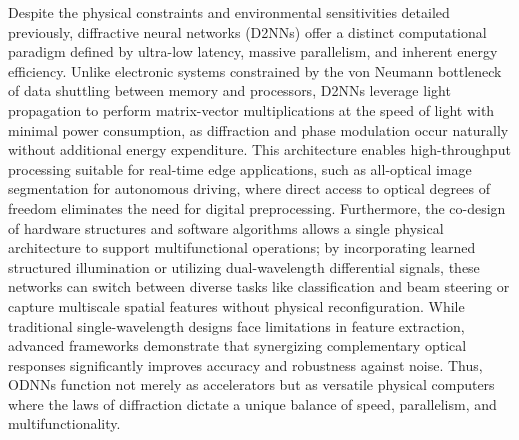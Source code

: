 \documentclass[11pt]{article}
\begin{document}
Despite the physical constraints and environmental sensitivities detailed previously, diffractive neural networks (D2NNs) offer a distinct computational paradigm defined by ultra-low latency, massive parallelism, and inherent energy efficiency. Unlike electronic systems constrained by the von Neumann bottleneck of data shuttling between memory and processors, D2NNs leverage light propagation to perform matrix-vector multiplications at the speed of light with minimal power consumption, as diffraction and phase modulation occur naturally without additional energy expenditure. This architecture enables high-throughput processing suitable for real-time edge applications, such as all-optical image segmentation for autonomous driving, where direct access to optical degrees of freedom eliminates the need for digital preprocessing. Furthermore, the co-design of hardware structures and software algorithms allows a single physical architecture to support multifunctional operations; by incorporating learned structured illumination or utilizing dual-wavelength differential signals, these networks can switch between diverse tasks like classification and beam steering or capture multiscale spatial features without physical reconfiguration. While traditional single-wavelength designs face limitations in feature extraction, advanced frameworks demonstrate that synergizing complementary optical responses significantly improves accuracy and robustness against noise. Thus, ODNNs function not merely as accelerators but as versatile physical computers where the laws of diffraction dictate a unique balance of speed, parallelism, and multifunctionality. \citep{doi_10_48550_arxiv_2602_07717_16cb1c7a} \citep{doi_10_1364_prj_576203_ae347fba} \citep{doi_10_1038_s41467_022_28702_0_1b79b43c} \citep{doi_10_1002_lpor_202500433_c50e8d3b} \citep{doi_10_1364_oe_598903_731aaac1} \citep{doi_10_1364_ol_591818_8738c4b1}
\end{document}
